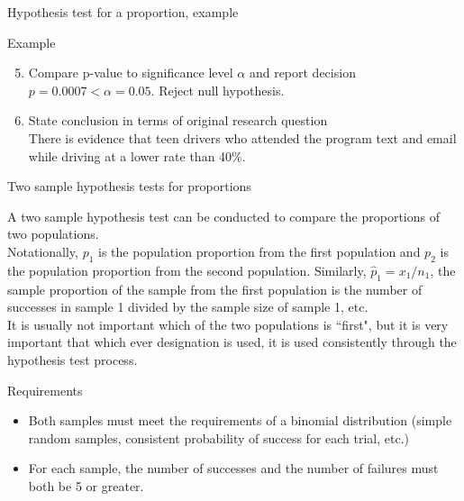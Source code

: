 \documentclass[xcolor=table, aspectratio=169, bigger]{beamer}
\begin{document}
\begin{frame}{Hypothesis test for a proportion, example}
\begin{exampleblock}{Example}
\begin{enumerate}
\setcounter{enumi}{4}
\item Compare p-value to significance level $\alpha$ and report decision\\
\pause$p = 0.0007 < \alpha =0.05$. Reject null hypothesis.

\pause\item State conclusion in terms of original research question\\
\pause There is evidence that teen drivers who attended the program text and email while driving at a lower rate than 40\%.
\end{enumerate}

\end{exampleblock}
\end{frame}


\begin{frame}{Two sample hypothesis tests for proportions}
\begin{block}{}
A two sample hypothesis test can be conducted to compare the proportions of two populations.\\
\pause\medskip
Notationally, $p_1$ is the population proportion from the first population and $p_2$ is the population proportion from the second population. Similarly, $\hat p_1 = x_1/n_1$, the sample proportion of the sample from the first population is the number of successes in sample 1 divided by the sample size of sample 1, etc.\\
\pause\medskip
It is usually not important which of the two populations is ``first", but it is very important that which ever designation is used, it is used consistently through the hypothesis test process.
\end{block}
\end{frame}

\begin{frame}{Requirements}
\begin{block}{}
\begin{itemize}
\item Both samples must meet the requirements of a binomial distribution (simple random samples, consistent probability of success for each trial, etc.)
\pause\item For each sample, the number of successes and the number of failures must both be 5 or greater.
\end{itemize}
\end{block}
\end{frame}
\end{document}
